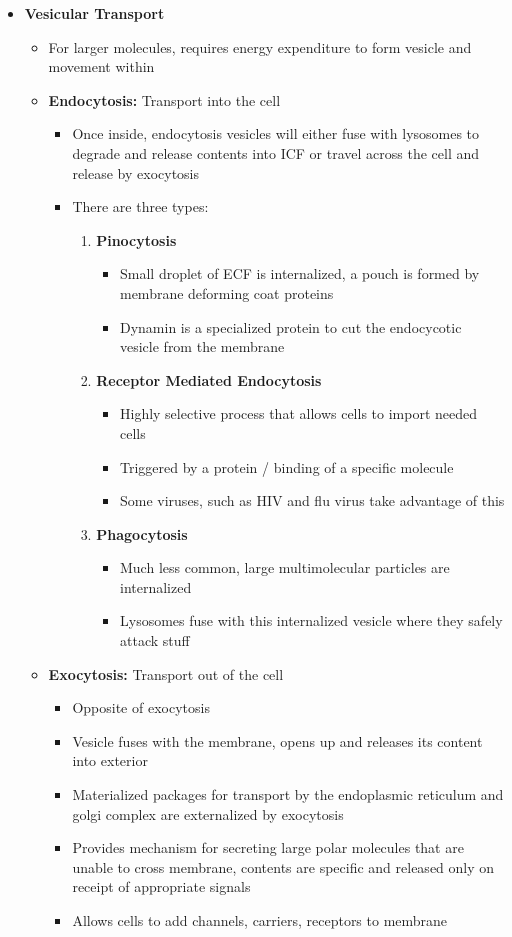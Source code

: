 \documentclass[11pt]{article}
\begin{document}
\begin{itemize}
\item \textbf{Vesicular Transport}
\begin{itemize}
\item For larger molecules, requires energy expenditure to form vesicle and movement within
\item \textbf{Endocytosis:} Transport into the cell
\begin{itemize}
\item Once inside, endocytosis vesicles will either fuse with lysosomes to degrade and release contents into ICF or travel across the cell and release by exocytosis 
\item There are three types:
\begin{enumerate}
\item \textbf{Pinocytosis}
\begin{itemize}
\item Small droplet of ECF is internalized, a pouch is formed by membrane deforming coat proteins
\item Dynamin is a specialized protein to cut the endocycotic vesicle from the membrane
\end{itemize}
\item \textbf{Receptor Mediated Endocytosis}
\begin{itemize}
\item Highly selective process that allows cells to import needed cells 
\item Triggered by a protein / binding of a specific molecule 
\item Some viruses, such as HIV and flu virus take advantage of this
\end{itemize}
\item \textbf{Phagocytosis}
\begin{itemize}
\item Much less common, large multimolecular particles are internalized 
\item Lysosomes fuse with this internalized vesicle where they safely attack stuff
\end{itemize}
\end{enumerate}
\end{itemize}
\item \textbf{Exocytosis:} Transport out of the cell
\begin{itemize}
\item Opposite of exocytosis 
\item Vesicle fuses with the membrane, opens up and releases its content into exterior
\item Materialized packages for transport by the endoplasmic reticulum and golgi complex are externalized by exocytosis
\item Provides mechanism for secreting large polar molecules that are unable to cross membrane, contents are specific and released only on receipt of appropriate signals 
\item Allows cells to add channels, carriers, receptors to membrane
\end{itemize}




\end{itemize}
\end{itemize}
\end{document}
